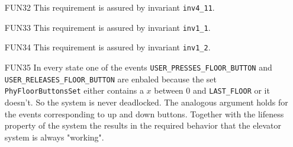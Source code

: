 \documentclass[a4paper,10pt]{article}
\begin{document}
\begin{enumerate}
\item[FUN32] This requirement is assured by invariant {\tt inv4\_11}.
\item[FUN33] This requirement is assured by invariant {\tt inv1\_1}.
\item[FUN34] This requirement is assured by invariant {\tt inv1\_2}.
\item[FUN35] In every state one of the events {\tt USER\_PRESSES\_FLOOR\_BUTTON} and {\tt USER\-\_RELEASES\_FLOOR\_BUTTON} are enbaled because the set {\tt PhyFloorButtonsSet} either contains a $x$ between $0$ and {\tt LAST\_FLOOR} or it doesn't. So the system is never deadlocked. The analogous argument holds for the events corresponding to up and down buttons. Together with the lifeness property of the system the results in the required behavior that the elevator system is always "working".

\end{enumerate}
\end{document}
